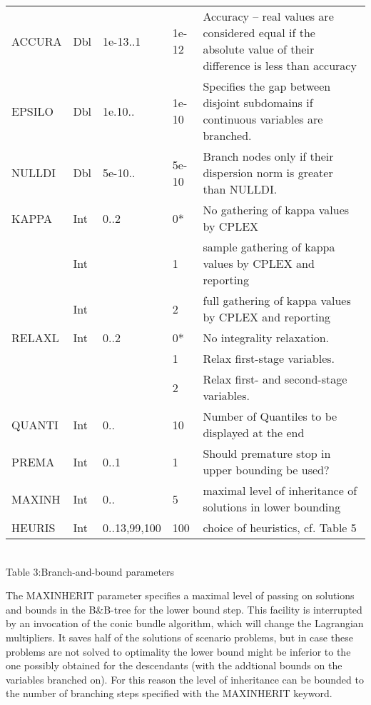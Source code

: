 \documentclass[11pt,draft]{article}
\newcommand{\+}{{\ti{+}}}
\newcommand{\1}{{\ti{1}}}
\begin{document}
\begin{center}
\begin{supertabular}{|llllp{6.2cm}|}
ACCURA&Dbl&1e-13..1&1e-12& Accuracy -- real values are considered equal if the absolute value of their difference is less than accuracy\\[0.2em]
EPSILO&Dbl&1e.10..&1e-10&Specifies the gap between disjoint subdomains if continuous variables are branched.\\[0.2em]
NULLDI&Dbl&5e-10..&5e-10&Branch nodes only if their dispersion norm is greater than NULLDI.\\[0.2em]
KAPPA&Int&0..2&0*&No gathering of kappa values by CPLEX\\
&Int&&1&sample gathering of kappa values by CPLEX and reporting\\
&Int&&2&full gathering of kappa values by CPLEX and reporting\\[0.2em]
RELAXL&Int&0..2&0*&No integrality relaxation.\\
&&&1&Relax first-stage variables.\\
&&&2&Relax first- and second-stage variables.\\[0.2em]
QUANTI&Int&0..&10&Number of Quantiles to be displayed at the end\\[0.2em]
PREMA&Int&0..1&1&Should premature stop in upper bounding be used?\\[0.2em]
MAXINH&Int&0..&5&maximal level of inheritance of solutions in lower bounding\\[0.2em]
HEURIS&Int&0..13,99,100&100&choice of heuristics, cf. Table 5\\[0.2em]
\hline
\end{supertabular}\\[0.5em]
{Table 3:\quad Branch-and-bound parameters}
\end{center}

The MAXINHERIT parameter specifies a maximal level of passing on solutions and bounds in the B\&B-tree
for the lower bound step.
This facility is interrupted by an invocation of the conic bundle algorithm, which will change the
Lagrangian multipliers. It saves half of the solutions of scenario problems, but in case these problems
are not solved to optimality the lower bound might be inferior to the one possibly obtained for the descendants
(with the addtional bounds on the variables branched on).
For this reason the level of inheritance can be bounded to the number
of branching steps specified with the \mbox{MAXINHERIT} keyword.
\end{document}
